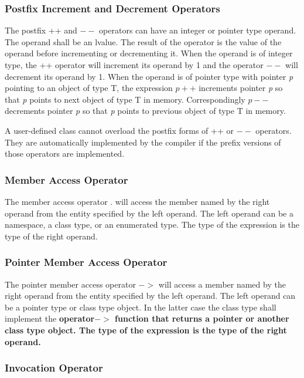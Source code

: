 \documentclass[a4paper,oneside,11pt]{article}
\begin{document}
\subsubsection{Postfix Increment and Decrement Operators}\label{postfix-inc-dec}

The postfix ++ and $--$ operators can have an integer or pointer type operand. The operand shall be an lvalue.
The result of the operator is the value of the operand before incrementing or decrementing it.
When the operand is of integer type, the ++ operator will increment its operand by 1 and the operator $--$ will decrement its operand by 1.
When the operand is of pointer type with pointer \emph{p} pointing to an object of type T,
the expression $p++$ increments pointer \emph{p} so that \emph{p} points to next object of type T in memory.
Correspondingly $p--$ decrements pointer \emph{p} so that \emph{p} points to previous object of type T in memory.

A user-defined class cannot overload the postfix forms of ++ or $--$ operators.
They are automatically implemented by the compiler if the prefix versions of those operators are implemented.

\subsubsection{Member Access Operator}\label{member-access}

The member access operator . will access the member named by the right operand from the entity specified by the left operand.
The left operand can be a namespace, a class type, or an enumerated type.
The type of the expression is the type of the right operand.

\subsubsection{Pointer Member Access Operator}\label{ptr-member-access}

The pointer member access operator $->$ will access a member named by the right operand from the entity specified by the left operand.
The left operand can be a pointer type or class type object. In the latter case the class type shall implement the \bf{operator$->$}
function that returns a pointer or another class type object. The type of the expression is the type of the right operand.

\subsubsection{Invocation Operator}\label{invocation}
\end{document}
